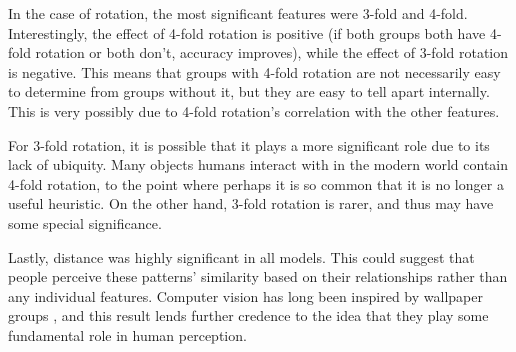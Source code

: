 In the case of rotation, the most significant features were 3-fold and 4-fold. Interestingly, the effect of 4-fold rotation is positive (if both groups both have 4-fold rotation or both don't, accuracy improves), while the effect of 3-fold rotation is negative. This means that groups with 4-fold rotation are not necessarily easy to determine from groups without it, but they are easy to tell apart internally. This is very possibly due to 4-fold rotation's correlation with the other features.

For 3-fold rotation, it is possible that it plays a more significant role due to its lack of ubiquity. Many objects humans interact with in the modern world contain 4-fold rotation, to the point where perhaps it is so common that it is no longer a useful heuristic. On the other hand, 3-fold rotation is rarer, and thus may have some special significance.

Lastly, distance was highly significant in all models. This could suggest that people perceive these patterns' similarity based on their relationships rather than any individual features. Computer vision has long been inspired by wallpaper groups \citep{yanxi1,yanxi2}, and this result lends further credence to the idea that they play some fundamental role in human perception.